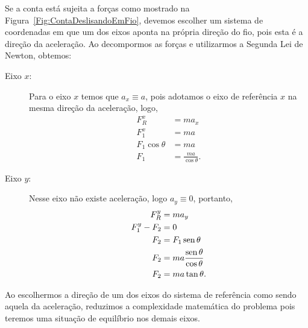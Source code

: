 Se a conta está sujeita a forças como mostrado na Figura~\ref{Fig:ContaDeslisandoEmFio}, devemos escolher um sistema de coordenadas em que um dos eixos aponta na própria direção do fio, pois esta é a direção da aceleração. Ao decompormos as forças e utilizarmos a Segunda Lei de Newton, obtemos:
\begin{description}
\item[Eixo $x$:] Para o eixo $x$ temos que $a_x \equiv a$, pois adotamos o eixo de referência $x$ na mesma direção da aceleração, logo,
\begin{align}
    F_R^x &= m a_x \\
    F_1^x &= m a \\
    F_1 \cos\theta &= m a \\
    F_1 &= \frac{ma}{\cos\theta}.
\end{align}

\item[Eixo $y$:] Nesse eixo não existe aceleração, logo $a_y \equiv 0$, portanto,
\begin{align}
    F_R^y &= m a_y \\
    F_1^y - F_2 &= 0 \\
    F_2 &= F_1 \operatorname{sen}\theta \\
    F_2 &= ma \frac{\operatorname{sen}\theta}{\cos\theta} \\
    F_2 &= ma\tan\theta.
\end{align}
\end{description}

\begin{marginfigure}
\centering
{}
\caption{Ao escolhermos a direção de um dos eixos do sistema de referência como sendo aquela da aceleração, reduzimos a complexidade matemática do problema pois teremos uma situação de equilíbrio nos demais eixos.\label{Fig:ContaDeslisandoEmFioRef}}
\end{marginfigure}


